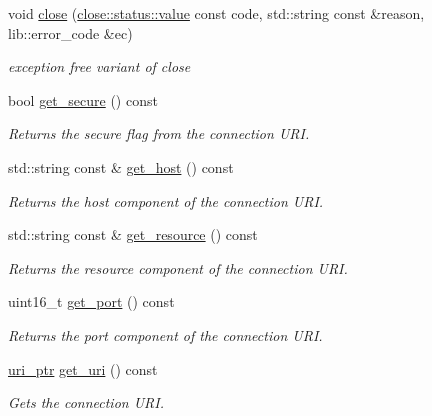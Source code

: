 \begin{DoxyCompactItemize}
\mbox{\label{classwebsocketpp_1_1connection_a436058fe88b1ba31080cec2a464634ae}} 
void \mbox{\hyperlink{classwebsocketpp_1_1connection_a436058fe88b1ba31080cec2a464634ae}{close}} (\mbox{\hyperlink{namespacewebsocketpp_1_1close_1_1status_a8614a5c4733d708e2d2a32191c5bef84}{close\+::status\+::value}} const code, std\+::string const \&reason, lib\+::error\+\_\+code \&ec)
\begin{DoxyCompactList}\small\item\em exception free variant of close \end{DoxyCompactList}\item 
bool \mbox{\hyperlink{classwebsocketpp_1_1connection_a38d87e9ef3c4514fcd72457a04c31260}{get\+\_\+secure}} () const
\begin{DoxyCompactList}\small\item\em Returns the secure flag from the connection U\+RI. \end{DoxyCompactList}\item 
std\+::string const  \& \mbox{\hyperlink{classwebsocketpp_1_1connection_a47e91744f959876b9fef4b18b04a809a}{get\+\_\+host}} () const
\begin{DoxyCompactList}\small\item\em Returns the host component of the connection U\+RI. \end{DoxyCompactList}\item 
std\+::string const  \& \mbox{\hyperlink{classwebsocketpp_1_1connection_a52ad47e67e1327e95d1572e04173a409}{get\+\_\+resource}} () const
\begin{DoxyCompactList}\small\item\em Returns the resource component of the connection U\+RI. \end{DoxyCompactList}\item 
uint16\+\_\+t \mbox{\hyperlink{classwebsocketpp_1_1connection_af6651a691ee345daf5cfd31b875965ab}{get\+\_\+port}} () const
\begin{DoxyCompactList}\small\item\em Returns the port component of the connection U\+RI. \end{DoxyCompactList}\item 
\mbox{\hyperlink{namespacewebsocketpp_aae370ea5ac83a8ece7712cb39fc23f5b}{uri\+\_\+ptr}} \mbox{\hyperlink{classwebsocketpp_1_1connection_a63f906681e9363f40dce7d2b65444a41}{get\+\_\+uri}} () const
\begin{DoxyCompactList}\small\item\em Gets the connection U\+RI. \end{DoxyCompactList}\item 

\end{DoxyCompactItemize}
